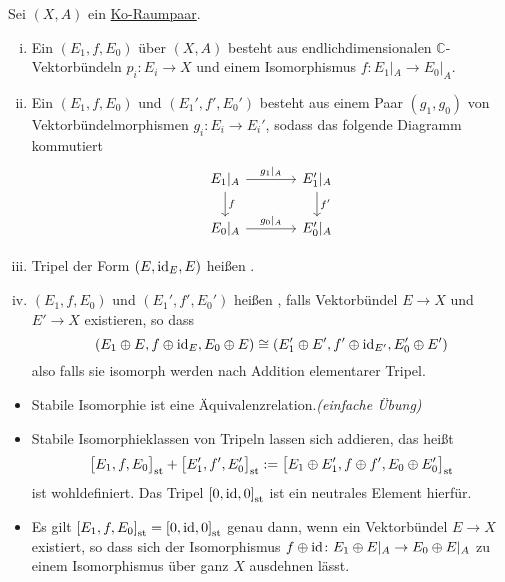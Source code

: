 \begin{definition}[{name=[Tripel, Morphismus von Tripeln und stabile Isomorphie]}, label=sub:31]
Sei $(X,A)$ ein \hyperref[def_koraumpaar]{Ko-Raumpaar}.
\begin{enumerate}[(i)]
	\item Ein  $(E_1,f,E_0)$ über $(X,A)$ besteht aus endlichdimensionalen $\mathds{C}$-Vektorbündeln $p_i \colon E_i \to X$ und einem Isomorphismus
	$f \colon E_1|_A \to E_0|_A$.
	\item Ein  $(E_1,f,E_0)$ und $(E_1',f',E_0')$ besteht aus einem Paar $(g_1,g_0)$ von Vektorbündelmorphismen $g_i \colon E_i \to E_i'$,
	sodass das folgende Diagramm kommutiert
	\[
		\begin{tikzcd}[column sep=large]
			E_1|_A \rar["g_1|_A"] \dar["f"]& E_1'|_A \dar["f'"]\\
			E_0|_A \rar["g_0|_A"] & E_0'|_A
		\end{tikzcd}
	\] 
	\item Tripel der Form $(E,\id_E,E)$ heißen .
	\item $(E_1,f,E_0)$ und $(E_1',f',E_0')$ heißen , falls Vektorbündel $E \to X$ und $E' \to X$ existieren, so dass
	\[
		\enbrace*{E_1 \oplus E, f \oplus \id_E, E_0 \oplus E} \cong \enbrace*{E_1' \oplus E', f' \oplus \id_{E'}, E_0' \oplus E' } 
	\]
	also falls sie isomorph werden nach Addition elementarer Tripel.
\end{enumerate}
\end{definition}
\begin{bemerkung}
\begin{itemize}
	\item Stabile Isomorphie ist eine Äquivalenzrelation.\hfill \emph{(einfache Übung)}
	\item Stabile Isomorphieklassen von Tripeln lassen sich addieren, das heißt
	\[
		\benbrace[\big]{E_1,f,E_0}_\st + \benbrace[\big]{E_1',f',E_0'}_\st := \benbrace[\big]{E_1 \oplus E_1', f \oplus f', E_0 \oplus E_0'}_\st  
	\]
	ist wohldefiniert. Das Tripel $\benbrace*{0,\id,0}_\st$ ist ein neutrales Element hierfür.
	\item Es gilt $\benbrace*{E_1,f,E_0}_\st=\benbrace*{0,\id,0}_\st$ genau dann, wenn ein Vektorbündel $E \to X$ existiert, so dass sich 
	der Isomorphismus $f \oplus \id \colon E_1  \oplus E|_A \to E_0 \oplus E|_A $ zu einem Isomorphismus über ganz $X$ ausdehnen lässt.
\end{itemize}
\end{bemerkung}

